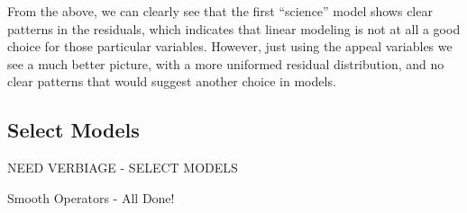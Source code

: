 \documentclass[]{article}
\begin{document}
From the above, we can clearly see that the first ``science'' model
shows clear patterns in the residuals, which indicates that linear
modeling is not at all a good choice for those particular variables.
However, just using the appeal variables we see a much better picture,
with a more uniformed residual distribution, and no clear patterns that
would suggest another choice in models.

\subsection{Select Models}\label{select-models}

NEED VERBIAGE - SELECT MODELS

Smooth Operators - All Done!
\end{document}
